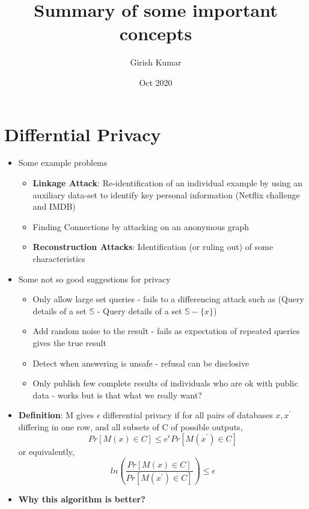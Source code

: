\documentclass{article}
\title{Summary of some important concepts}
\author{Girish Kumar }
\date{Oct 2020}
\begin{document}
\maketitle

\tableofcontents
\newpage

\section{Differntial Privacy}

\begin{itemize}
    \item Some example problems
        \begin{itemize}
            \item \textbf{Linkage Attack}: Re-identification of an individual example by using an auxiliary data-set to identify key personal information (Netflix challenge and IMDB)
            \item Finding Connections by attacking on an anonymous graph
            \item \textbf{Reconstruction Attacks}: Identification (or ruling out) of  some characteristics
        \end{itemize}
    \item Some not so good suggestions for privacy
        \begin{itemize}
            \item Only allow large set queries - fails to a differencing attack such as (Query details of a set $\mathbb{S}$ - Query details of a set $\mathbb{S}-\{x\}$)
            \item Add random noise to the result - fails as expectation of repeated queries gives the true result
            \item Detect when answering is unsafe - refusal can be disclosive
            \item Only publish few complete results of individuals who are ok with public data - works but is that what we really want?
        \end{itemize}
    \item \textbf{Definition}: M gives $\epsilon$ differential privacy if for all pairs of databases $x, x^\prime$ differing in one row, and all subsets of C of possible outputs,
    $$Pr[M(x) \in C] \leq e^\epsilon Pr[M(x^\prime) \in C]$$
    or equivalently,
    $$ln\left( \frac{Pr[M(x) \in C]}{Pr[M(x^\prime) \in C]} \right) \leq \epsilon$$
    \item \textbf{Why this algorithm is better?}
        \begin{itemize}

\end{itemize}
\end{itemize}
\end{document}

